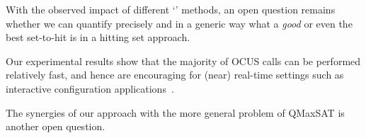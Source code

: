 With the observed impact of different `\grow' methods, an open question remains whether we can quantify precisely and in a generic way what a \textit{good} or even the best set-to-hit is in a hitting set approach. 

Our experimental results show that the majority of OCUS calls can be performed relatively fast, and hence are encouraging for (near) real-time settings such as interactive configuration applications~\cite{van2017kb}.


The synergies of our approach with the more general problem of QMaxSAT \cite{DBLP:journals/constraints/IgnatievJM16} is another open question.


